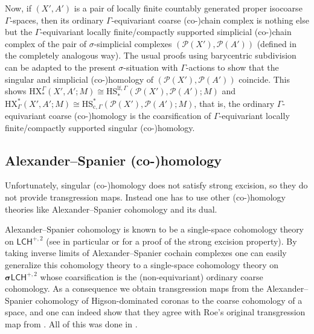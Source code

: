 \documentclass[pdftex]{sigma}
\numberwithin{equation}{section}
\theoremstyle{definition}
\newcommand{\cP}{\mathcal{P}}
\newcommand{\categoryfont}[1]{\mathsf{#1}}
\newcommand{\sLCHzp}[1][\Gamma]{\boldsymbol\sigma\categoryfont{LCH}_{#1}^{+,2}}
\newcommand{\LCHzp}[1][\Gamma]{\categoryfont{LCH}_{#1}^{+,2}}
\newcommand{\HX}{\mathrm{HX}}
\newcommand{\HS}{\mathrm{HS}}
\newcommand{\lf}{\mathrm{lf}}
\newcommand{\cs}{\mathrm{c}}
\begin{document}
Now, if $(X',A')$ is a pair of locally finite countably generated proper isocoarse $\Gamma$-spaces, then its ordinary $\Gamma$-equivariant coarse \mbox{(co-)}chain complex is nothing else but the $\Gamma$-equivariant locally finite/compactly supported simplicial \mbox{(co-)}chain complex of the pair of $\sigma$-simplicial complexes $(\cP(X'),\cP(A'))$ (defined in the completely analogous way). The usual proofs using barycentric subdivision can be adapted to the present $\sigma$-situation with $\Gamma$-actions to show that the singular and simplicial \mbox{(co-)}homology of $(\cP(X'),\cP(A'))$ coincide. This shows $\HX^\Gamma_*(X',A';M)\cong \HS^{\lf,\Gamma}_*(\cP(X'),\cP(A');M)$ and $\HX_\Gamma^*(X',A';M)\cong \HS_{\cs,\Gamma}^*(\cP(X'),\cP(A');M)$, that is, the ordinary $\Gamma$-equivariant coarse \mbox{(co-)}homology is the coarsification of $\Gamma$-equivariant locally finite/compactly supported singular \mbox{(co-)}homology.

\subsection{Alexander--Spanier (co-)homology}\label{sec:AlexanderSpanier}

Unfortunately, singular \mbox{(co-)}homology does not satisfy strong excision, so they do not provide transgression maps. Instead one has to use other \mbox{(co-)}homology theories like Alexander--Spanier cohomology and its dual.

Alexander--Spanier cohomology is known to be a single-space cohomology theory on $\LCHzp[]$ (see in particular \cite[Section 6.6]{Spanier66} or \cite[Section~1.7]{MasseyHomologyCohomologyBook} for a proof of the strong excision property).
By taking inverse limits of Alexander--Spanier cochain complexes one can easily generalize this cohomology theory to a single-space cohomology theory on $\sLCHzp[]$ whose coarsification is the (non-equivariant) ordinary coarse cohomology. As a consequence we obtain transgression maps from the Alexander--Spanier cohomology of Higson-dominated coronas to the coarse cohomology of a space, and one can indeed show that they agree with Roe's original transgression map from \cite[Section~5.3]{RoeCoarseCohomIndexTheory}.
All of this was done in \cite[Section~4.4]{EngelWulff}.
\end{document}
